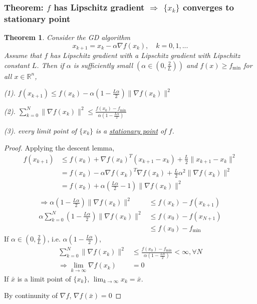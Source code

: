 \documentclass[11pt,a4paper]{article}
\newtheorem{theorem}{Theorem}
\begin{document}
\subsubsection{Theorem: $f$ has Lipschitz gradient $\Rightarrow$ $\{x_k\}$ converges to stationary point}
\begin{theorem}
Consider the GD algorithm $$x_{k+1}=x_k-\alpha \nabla f(x_k),\quad k=0,1,...$$
Assume that $f$ has Lipschitz gradient with a Lipschitz gradient with Lipschitz constant $L$. Then if $\alpha$ is sufficiently small $(\alpha\in(0,\frac{2}{L}))$ and $f(x)\geq f_{\min}$ for all $x\in \mathbb{R}^n$,

(1). $f(x_{k+1})\leq f(x_k)-\alpha (1-\frac{L\alpha}{2})\|\nabla f(x_k)\|^2$

(2). $\sum_{k=0}^N\|\nabla f(x_k)\|^2\leq \frac{f(x_0)-f_{\min}}{\alpha(1-\frac{L\alpha}{2})}$

(3). every limit point of $\{x_k\}$ is a \underline{stationary point} of $f$.
\end{theorem}
\begin{proof}
    Applying the descent lemma,
    \begin{equation}
        \begin{aligned}
            f(x_{k+1})&\leq f(x_k)+\nabla f(x_k)^T(x_{k+1}-x_k)+\frac{L}{2}\|x_{k+1}-x_k\|^2\\
            &=f(x_k)-\alpha\nabla f(x_k)^T \nabla f(x_k)+\frac{L}{2}\alpha^2\|\nabla f(x_k)\|^2\\
            &=f(x_k)+\alpha (\frac{L\alpha}{2}-1)\|\nabla f(x_k)\|^2\\
        \end{aligned}
        \nonumber
    \end{equation}
    \begin{equation}
        \begin{aligned}
            \Rightarrow	\alpha (1-\frac{L\alpha}{2})\|\nabla f(x_k)\|^2&\leq f(x_k)-f(x_{k+1})\\
            \alpha \sum_{k=0}^N(1-\frac{L\alpha}{2})\|\nabla f(x_k)\|^2&\leq f(x_0)-f(x_{N+1})\\
            &\leq f(x_0)-f_{\min}
        \end{aligned}
        \nonumber
    \end{equation}
    If $\alpha\in(0,\frac{2}{L})$, i.e. $\alpha(1-\frac{L\alpha}{2})$,
    \begin{equation}
        \begin{aligned}
            \sum_{k=0}^N\|\nabla f(x_k)\|^2&\leq \frac{f(x_0)-f_{\min}}{\alpha(1-\frac{L\alpha}{2})}<\infty,\forall N\\
            \Rightarrow	\lim_{k \rightarrow	\infty}\nabla f(x_k)&=0
        \end{aligned}
        \nonumber
    \end{equation}
    If $\bar{x}$ is a limit point of $\{x_k\}$, $\lim_{k \rightarrow \infty}x_k=\bar{x}$.

    By continunity of $\nabla f$, $\nabla f(\bar{x})=0$
\end{proof}
\end{document}
